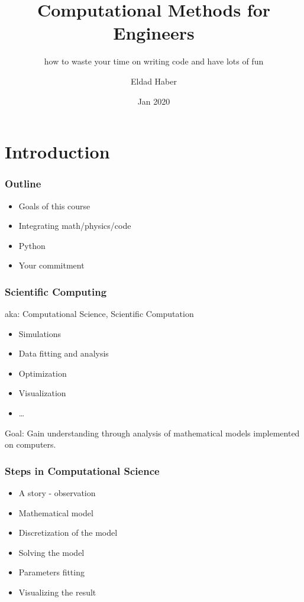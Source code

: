 \documentclass[12pt,fleqn]{beamer}
\title{Computational Methods for Engineers}
\subtitle{how to waste  your time on writing code and have lots of fun }
\author[Haber ]{Eldad Haber }
\institute{
  
}
\date{Jan 2020}
\newcommand\makebeamertitle{\frame{\maketitle}}%
\begin{document}
\makebeamertitle




\section{Introduction} %
\label{sec:introduction}

\begin{frame}\frametitle{Outline}
\begin{itemize}
	\item Goals of this course
	\item Integrating math/physics/code
	\item Python
	\item Your commitment 
\end{itemize}
\end{frame}

\begin{frame}
	\frametitle{Scientific Computing}
	aka: Computational Science, Scientific Computation
	
	\begin{itemize}
		\item Simulations
		\item Data fitting and analysis
		\item Optimization
		\item Visualization
		\item \ldots
	\end{itemize}
	
	Goal: Gain understanding through analysis of mathematical models implemented on computers.
	
\end{frame}

\begin{frame}
	\frametitle{Steps in Computational Science}
	
\begin{itemize}
\item A story - observation
\item Mathematical model
\item Discretization of the model
\item Solving the model 
\item Parameters fitting
\item Visualizing the result
\end{itemize}	

\end{frame}
\end{document}
